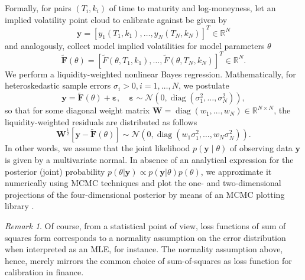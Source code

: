 \documentclass{article}
\theoremstyle{remark}
\newtheorem{remark}{Remark}
\DeclareMathOperator{\diag}{diag}
\begin{document}
Formally, for pairs $\left(T_i, k_i\right)$ of time to maturity and
log-moneyness, let an implied volatility point cloud to calibrate against be
given by
\begin{equation*}
  \bm{y} = \left[y_1\left(T_1, k_1\right), \ldots, y_N\left(T_N,
      k_N\right)\right]^T \in \mathbb{R}^N 
\end{equation*}
and analogously, collect model implied volatilities for model parameters
$\theta$
\begin{equation*}
  \bm{\widetilde{F}}\left(\theta\right) = \left[\widetilde{F}\left(\theta,
      T_1, k_1\right), \ldots, \widetilde{F}\left(\theta, T_N,
      k_N\right)\right]^T \in \mathbb{R}^N.
\end{equation*}
We perform a liquidity-weighted nonlinear Bayes regression. Mathematically,
for heteroskedastic sample errors $\sigma_i>0, i=1, \ldots, N$, we postulate  
\begin{equation*}
  \bm{y} = \bm{\widetilde{F}}\left(\theta\right) + \bm{\varepsilon}, \quad
  \bm{\varepsilon} \sim \mathcal{N}\left(0, \diag(\sigma_1^2, \ldots,
    \sigma_N^2) \right),
\end{equation*}
so that for some diagonal weight matrix $\bm{W} = \diag(w_1, \ldots, w_N) \in
\mathbb{R}^{N \times N}$, the liquidity-weighted residuals are distributed as
follows 
\begin{equation*}
  \bm{W}^{\frac{1}{2}}\left[\bm{y} -
    \bm{\widetilde{F}}\left(\theta\right)\right] \sim  \mathcal{N}\left(0,
    \diag(w_1\sigma_1^2, \ldots, w_N\sigma_N^2)\right).
\end{equation*} 
In other words, we assume that the joint likelihood
$p\left( \bm{y} \mid \theta \right)$ of observing data $\bm{y}$ is given by a
multivariate normal. In absence of an analytical expression for the posterior
(joint) probability $p(\theta|\bm{y}) \propto p(\bm{y}|\theta) p(\theta)$, we
approximate it numerically using MCMC techniques \cite{FHLG13} and plot the
one- and two-dimensional projections of the four-dimensional posterior by
means of an MCMC plotting library \cite{For16}.

\begin{remark}
  \label{rem:sum-squares-gaussian}
  Of course, from a statistical point of view, loss functions of sum of
  squares form corresponds to a normality assumption on the error distribution
  when interpreted as an MLE, for instance. The normality assumption above,
  hence, merely mirrors the common choice of sum-of-squares as loss function
  for calibration in finance.
\end{remark}
\end{document}
